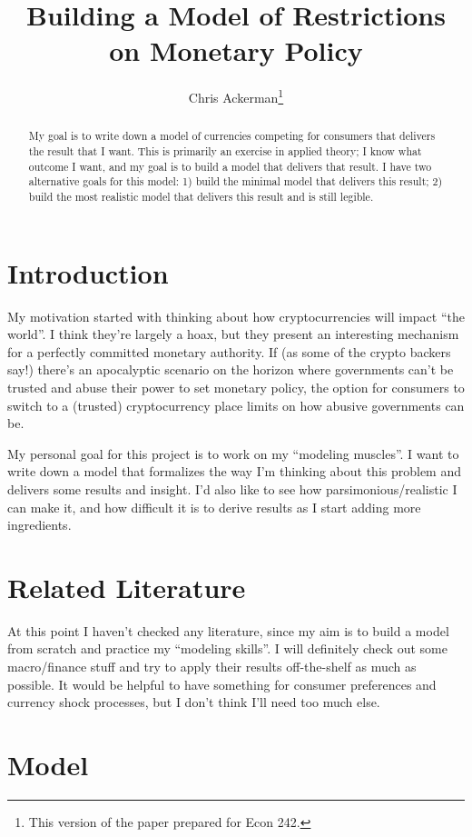 \documentclass[dvipsnames]{article}
\title{Building a Model of Restrictions on Monetary Policy}
\author{Chris Ackerman\thanks{This version of the paper prepared for Econ 242.}}
\begin{document}
\maketitle
\begin{abstract}
  My goal is to write down a model of currencies competing for consumers that delivers the result that I want. This is primarily an exercise in applied theory; I know what outcome I want, and my goal is to build a model that delivers that result. I have two alternative goals for this model: 1) build the minimal model that delivers this result; 2) build the most realistic model that delivers this result and is still legible. 
\end{abstract}

\section{Introduction}
My motivation started with thinking about how cryptocurrencies will impact ``the world''. I think they're largely a hoax, but they present an interesting mechanism for a perfectly committed monetary authority. If (as some of the crypto backers say!) there's an apocalyptic scenario on the horizon where governments can't be trusted and abuse their power to set monetary policy, the option for consumers to switch to a (trusted) cryptocurrency place limits on how abusive governments can be. 


My personal goal for this project is to work on my ``modeling muscles''. I want to write down a model that formalizes the way I'm thinking about this problem and delivers some results and insight. I'd also like to see how parsimonious/realistic I can make it, and how difficult it is to derive results as I start adding more ingredients.


\section{Related Literature}
At this point I haven't checked any literature, since my aim is to build a model from scratch and practice my ``modeling skills''. I will definitely check out some macro/finance stuff and try to apply their results off-the-shelf as much as possible. It would be helpful to have something for consumer preferences and currency shock processes, but I don't think I'll need too much else.

\section{Model}
\end{document}
